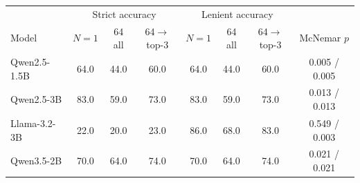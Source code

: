 \begin{tabular}{lccc|ccc|c}
\toprule
 & \multicolumn{3}{c|}{Strict accuracy} & \multicolumn{3}{c|}{Lenient accuracy} & \\
Model & $N{=}1$ & 64 all & 64$\to$top-3 & $N{=}1$ & 64 all & 64$\to$top-3 & McNemar $p$ \\
\midrule
Qwen2.5-1.5B & 64.0 & 44.0 & 60.0 & 64.0 & 44.0 & 60.0 & 0.005 / 0.005 \\
Qwen2.5-3B & 83.0 & 59.0 & 73.0 & 83.0 & 59.0 & 73.0 & 0.013 / 0.013 \\
Llama-3.2-3B & 22.0 & 20.0 & 23.0 & 86.0 & 68.0 & 83.0 & 0.549 / 0.003 \\
Qwen3.5-2B & 70.0 & 64.0 & 74.0 & 70.0 & 64.0 & 74.0 & 0.021 / 0.021 \\
\bottomrule
\end{tabular}